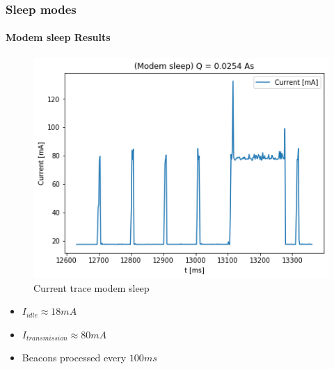 \begin{frame}
    \frametitle{Sleep modes}
    \framesubtitle{Modem sleep Results}

    \begin{minipage}{0.45 \textwidth}
        \begin{figure}[H]
            \centering
            \includegraphics[width = 1 \linewidth]{../paper/fig/modem_sleep.png}
            \caption{Current trace modem sleep}
            \label{fig:experiment_modem_light_sleep}
        \end{figure}
    \end{minipage}
    \begin{minipage}{0.45 \textwidth}
        \begin{itemize}
            \item $I_{idle} \approx 18mA$
            \item $I_{transmission} \approx 80mA$
            \item Beacons processed every $100ms$
        \end{itemize}
    \end{minipage}
\end{frame}

